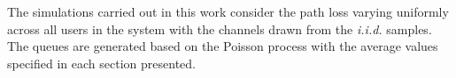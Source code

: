 
The simulations carried out in this work consider the path loss varying uniformly across all users in the system with the channels drawn from the \textit{i.i.d.} samples. The queues are generated based on the Poisson process with the average values specified in each section presented. 